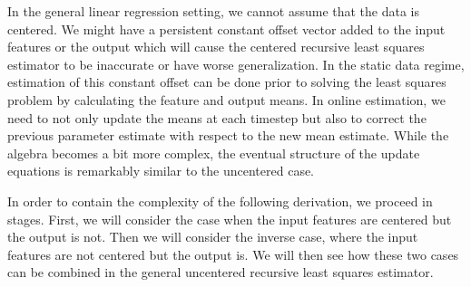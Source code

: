 In the general linear regression setting, we cannot assume that the data is
centered. We might have a persistent constant offset vector added to the input
features or the output which will cause the centered recursive least squares
estimator to be inaccurate or have worse generalization. In the static data
regime, estimation of this constant offset can be done prior to solving the
least squares problem by calculating the feature and output means. In online
estimation, we need to not only update the means at each timestep but also to
correct the previous parameter estimate with respect to the new mean estimate.
While the algebra becomes a bit more complex, the eventual structure of the
update equations is remarkably similar to the uncentered case.

In order to contain the complexity of the following derivation, we proceed in
stages. First, we will consider the case when the input features are centered
but the output is not. Then we will consider the inverse case, where the input
features are not centered but the output is. We will then see how these two
cases can be combined in the general uncentered recursive least squares
estimator.

